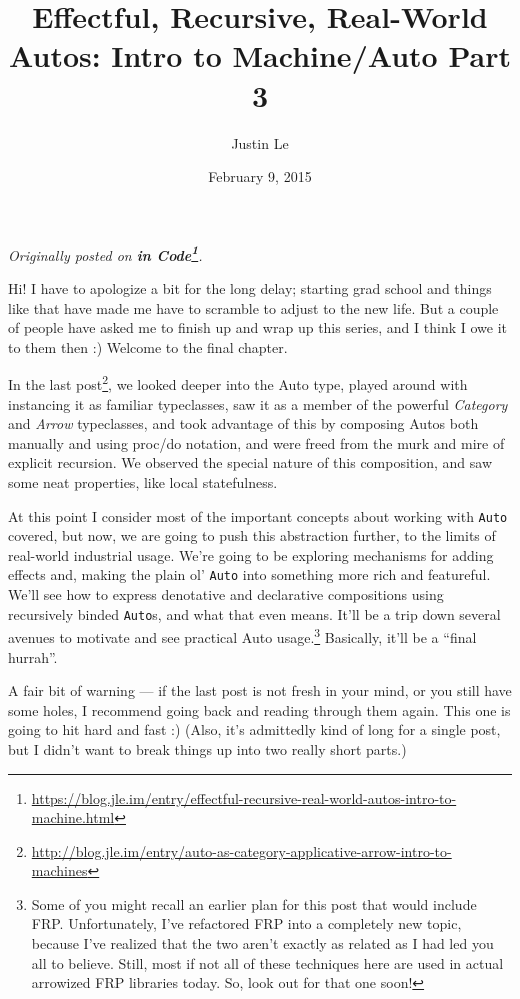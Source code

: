 \documentclass[]{article}
\title{Effectful, Recursive, Real-World Autos: Intro to Machine/Auto Part 3}
\author{Justin Le}
\date{February 9, 2015}
\renewcommand{\href}[2]{#2\footnote{\url{#1}}}
\begin{document}
\maketitle

\emph{Originally posted on
\textbf{\href{https://blog.jle.im/entry/effectful-recursive-real-world-autos-intro-to-machine.html}{in
Code}}.}

Hi! I have to apologize a bit for the long delay; starting grad school and
things like that have made me have to scramble to adjust to the new life. But a
couple of people have asked me to finish up and wrap up this series, and I think
I owe it to them then :) Welcome to the final chapter.

In the
\href{http://blog.jle.im/entry/auto-as-category-applicative-arrow-intro-to-machines}{last
post}, we looked deeper into the Auto type, played around with instancing it as
familiar typeclasses, saw it as a member of the powerful \emph{Category} and
\emph{Arrow} typeclasses, and took advantage of this by composing Autos both
manually and using proc/do notation, and were freed from the murk and mire of
explicit recursion. We observed the special nature of this composition, and saw
some neat properties, like local statefulness.

At this point I consider most of the important concepts about working with
\texttt{Auto} covered, but now, we are going to push this abstraction further,
to the limits of real-world industrial usage. We're going to be exploring
mechanisms for adding effects and, making the plain ol' \texttt{Auto} into
something more rich and featureful. We'll see how to express denotative and
declarative compositions using recursively binded \texttt{Auto}s, and what that
even means. It'll be a trip down several avenues to motivate and see practical
Auto usage.\footnote{Some of you might recall an earlier plan for this post that
  would include FRP. Unfortunately, I've refactored FRP into a completely new
  topic, because I've realized that the two aren't exactly as related as I had
  led you all to believe. Still, most if not all of these techniques here are
  used in actual arrowized FRP libraries today. So, look out for that one soon!}
Basically, it'll be a ``final hurrah''.

A fair bit of warning --- if the last post is not fresh in your mind, or you
still have some holes, I recommend going back and reading through them again.
This one is going to hit hard and fast :) (Also, it's admittedly kind of long
for a single post, but I didn't want to break things up into two really short
parts.)
\end{document}
